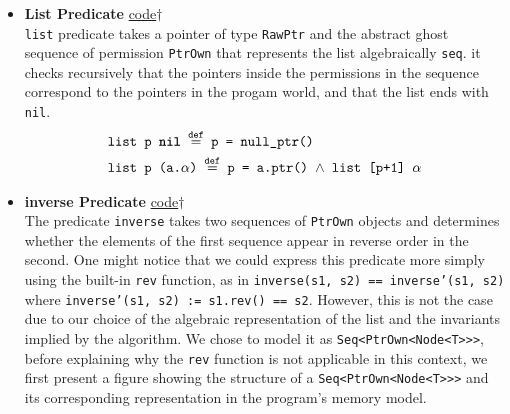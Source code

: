 \documentclass[11pt,a4paper]{article}
\begin{document}
\subsubsection{}
\begin{itemize}
    \item \textbf{List Predicate}
        \hyperlink{list}{code$\dagger$}\\
        \texttt{list} predicate takes a pointer of type \texttt{RawPtr} and the abstract ghost sequence of permission \texttt{PtrOwn} that represents the list algebraically \texttt{seq}. it checks recursively that the pointers inside the permissions in the sequence correspond to the pointers in the progam world, and that the list ends with \texttt{nil}.\\
        \begin{align}
            &\texttt{list p \textbf{nil} $\overset{\text{def}}{=}$ p = null\_ptr()}\\
            &\texttt{list p (a.$\alpha$) $\overset{\text{def}}{=}$ p = a.ptr() $\land$ list [p+1] $\alpha$}
        \end{align}
    \item \textbf{inverse Predicate}  
    \hyperlink{inverse}{code$\dagger$}\\
    The predicate \texttt{inverse} takes two sequences of \texttt{PtrOwn} objects and determines whether the elements of the first sequence appear in reverse order in the second. One might notice that we could express this predicate more simply using the built-in \texttt{rev} function, as in \texttt{inverse(s1, s2) == inverse'(s1, s2)} where \texttt{inverse'(s1, s2) := s1.rev() == s2}. However, this is not the case due to our choice of the algebraic representation of the list and the invariants implied by the algorithm. We chose to model it as \texttt{Seq<PtrOwn<Node<T>>>},
    before explaining why the \texttt{rev} function is not applicable in this context, we first present a figure showing the structure of a \texttt{Seq<PtrOwn<Node<T>>>} and its corresponding representation in the program’s memory model.
    
    \begin{figure}[h]
    \centering
\end{figure}
\end{itemize}
\end{document}
